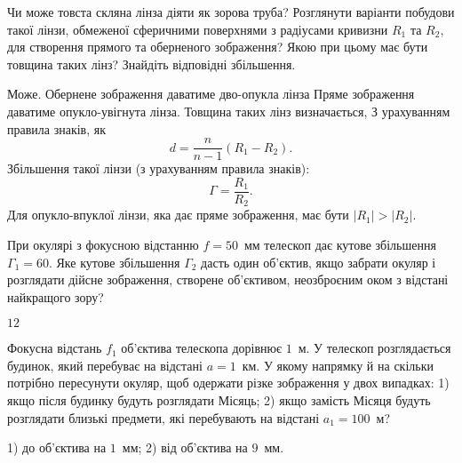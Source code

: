 \begin{problem}%
    Чи може товста скляна лінза діяти як зорова труба? Розглянути варіанти побудови такої лінзи, обмеженої сферичними поверхнями з радіусами кривизни $R_1$ та $R_2$, для створення прямого та	оберненого зображення? Якою при цьому має бути товщина таких лінз? Знайдіть відповідні збільшення.
    \begin{solution}
        Може. Обернене зображення даватиме дво-опукла лінза  Пряме зображення даватиме опукло-увігнута лінза.  Товщина таких лінз визначається,  З урахуванням правила знаків, як
        \begin{equation*}
            d = \frac{n}{n - 1} (R_1 - R_2).
        \end{equation*}
    Збільшення такої лінзи (з урахуванням правила знаків):
    \begin{equation*}
        \Gamma = \frac{R_1}{R_2}.
    \end{equation*}
    Для опукло-впуклої лінзи, яка дає пряме зображення, має бути $|R_1| > |R_2|$.
    \end{solution}
\end{problem}


\begin{problem}%
При окулярі з фокусною відстанню $f = 50$~мм телескоп дає кутове
збільшення $\Gamma_1 = 60$. Яке кутове збільшення $\Gamma_2$ дасть один об'єктив, якщо
забрати окуляр і розглядати дійсне зображення, створене об'єктивом,
неозброєним оком з відстані найкращого зору?
\begin{solution}
	$12$
\end{solution}
\end{problem}


\begin{problem}%
Фокусна відстань $f_1$ об'єктива телескопа дорівнює $1$~м. У телескоп
розглядається будинок, який перебуває на відстані $a = 1$~км. У якому
напрямку й на скільки потрібно пересунути окуляр, щоб одержати різке
зображення у двох випадках: 1) якщо після будинку будуть розглядати
Місяць; 2) якщо замість Місяця будуть розглядати близькі предмети, які
перебувають на відстані $a_1 = 100$~м?
\begin{solution}
	1) до об’єктива на $1$~мм; 2) від об’єктива на $9$~мм.
\end{solution}
\end{problem}


